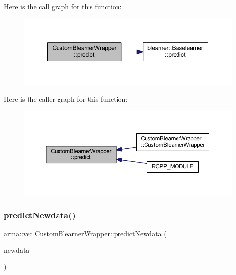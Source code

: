 Here is the call graph for this function\+:\nopagebreak
\begin{figure}[H]
\begin{center}
\leavevmode
\includegraphics[width=348pt]{class_custom_blearner_wrapper_ac3c5d68400ea9473815ab2daed218473_cgraph}
\end{center}
\end{figure}
Here is the caller graph for this function\+:\nopagebreak
\begin{figure}[H]
\begin{center}
\leavevmode
\includegraphics[width=350pt]{class_custom_blearner_wrapper_ac3c5d68400ea9473815ab2daed218473_icgraph}
\end{center}
\end{figure}
\mbox{\label{class_custom_blearner_wrapper_a0aba49ca5396f5bd09a745003436dd3f}} 
\subsubsection{\texorpdfstring{predict\+Newdata()}{predictNewdata()}}
{\footnotesize\ttfamily arma\+::vec Custom\+Blearner\+Wrapper\+::predict\+Newdata (\begin{DoxyParamCaption}\item[{\mbox{\hyperlink{class_data_wrapper}{Data\+Wrapper}} \&}]{newdata }\end{DoxyParamCaption})\hspace{0.3cm}{\ttfamily [inline]}}

